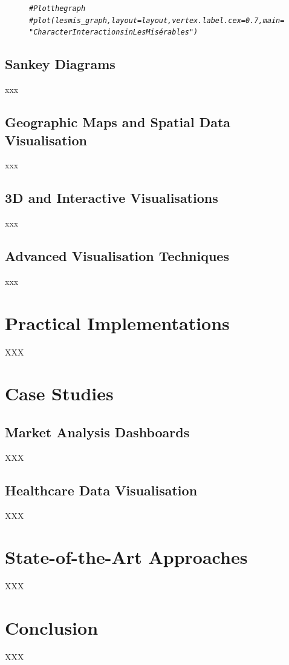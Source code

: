 \documentclass{article}\usepackage[]{graphicx}\usepackage[]{xcolor}
\makeatletter
\newcommand{\hlcom}[1]{\textcolor[rgb]{0.678,0.584,0.686}{\textit{#1}}}%
\newenvironment{kframe}{%
 \def\at@end@of@kframe{}%
 \ifinner\ifhmode%
  \def\at@end@of@kframe{\end{minipage}}%
  \begin{minipage}{\columnwidth}%
 \fi\fi%
 \def\FrameCommand##1{\hskip\@totalleftmargin \hskip-\fboxsep
 \colorbox{shadecolor}{##1}\hskip-\fboxsep
     \hskip-\linewidth \hskip-\@totalleftmargin \hskip\columnwidth}%
 \MakeFramed {\advance\hsize-\width
   \@totalleftmargin\z@ \linewidth\hsize
   \@setminipage}}%
 {\par\unskip\endMakeFramed%
 \at@end@of@kframe}
\newenvironment{knitrout}{}{} %
\makeatother
\begin{document}
\begin{figure}[h]
\centering
\begin{knitrout}
\color{fgcolor}\begin{kframe}
\begin{alltt}
\hlcom{# Plot the graph}
\hlcom{#plot(lesmis_graph, layout = layout, vertex.label.cex = 0.7, main = "Character Interactions in Les Misérables")}
\end{alltt}
\end{kframe}
\end{knitrout}
\end{figure}

\subsection{Sankey Diagrams}
xxx

\subsection{Geographic Maps and Spatial Data Visualisation}
xxx

\subsection{3D and Interactive Visualisations}
xxx

\subsection{Advanced Visualisation Techniques}
xxx




\section{Practical Implementations}
XXX




\section{Case Studies}
\subsection{Market Analysis Dashboards}
XXX
\subsection{Healthcare Data Visualisation}
XXX




\section{State-of-the-Art Approaches}
XXX



\section{Conclusion}
XXX
\end{document}
